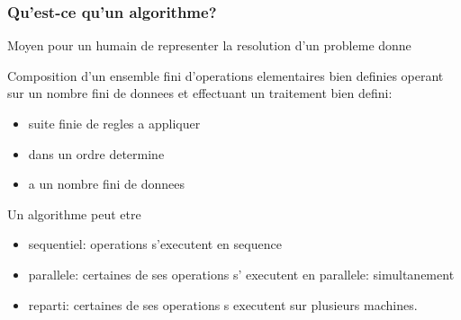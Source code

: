\documentclass[../main.tex]{subfiles}
\begin{document}
\subsubsection{Qu'est-ce qu'un algorithme?}
Moyen pour un humain de representer la resolution d'un probleme donne\\
\begin{defn}[Algorithme]
	Composition d'un ensemble fini d'operations elementaires bien definies operant sur un nombre fini de donnees et effectuant un traitement bien defini:
	\begin{itemize}
		\item suite finie de regles a appliquer\\
		\item dans un ordre determine\\
		\item a un nombre fini de donnees
\end{itemize}
Un algorithme peut etre
\begin{itemize}
	\item sequentiel: operations s'executent en sequence\\
	\item parallele: certaines de ses operations s' executent en parallele: simultanement\\
	\item reparti: certaines de ses operations s executent sur plusieurs machines.
\end{itemize}
\end{defn}
\end{document}

